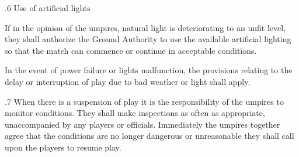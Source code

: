 \documentclass[12pt]{article}
\begin{document}
\vspace{\baselineskip}
{\fontsize{9pt}{10.8pt}.6 \tabto{0.49in} Use of artificial lights\par}\par


\vspace{\baselineskip}
\begin{adjustwidth}{0.5in}{0.07in}
{\fontsize{9pt}{10.8pt}\selectfont If in the opinion of the umpires, natural light is deteriorating to an unfit level, they shall authorize the Ground Authority to use the available artificial lighting so that the match can commence or continue in acceptable conditions.\par}\par

\end{adjustwidth}


\vspace{\baselineskip}
\begin{adjustwidth}{0.5in}{0.14in}
{\fontsize{9pt}{10.8pt}\selectfont In the event of power failure or lights malfunction, the provisions relating to the delay or interruption of play due to bad weather or light shall apply.\par}\par

\end{adjustwidth}


\vspace{\baselineskip}
\begin{adjustwidth}{0.5in}{0.03in}
{\fontsize{9pt}{10.8pt}.7 \tabto{0.49in} When there is a suspension of play it is the responsibility of the umpires to monitor conditions. They shall make inspections as often as appropriate, unaccompanied by any players or officials. Immediately the umpires together agree that the conditions are no longer dangerous or unreasonable they shall call upon the players to resume play.\par}\par

\end{adjustwidth}


\vspace{\baselineskip}

\vspace{\baselineskip}

\vspace{\baselineskip}

\vspace{\baselineskip}
\end{document}
